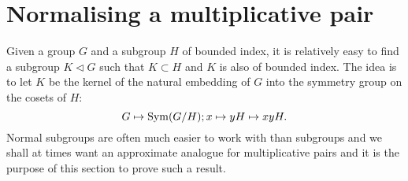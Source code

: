 \documentclass[12pt]{amsart}
\numberwithin{equation}{section}
\theoremstyle{plain}
\theoremstyle{definition}
\providecommand{\Sym}{\mathop{\rm Sym}\nolimits}
\begin{document}
\section{Normalising a multiplicative pair}\label{sec.norm}
 
Given a group $G$ and a subgroup $H$ of bounded index, it is relatively easy to find a subgroup $K\lhd G$ such that $K \subset H$ and $K$ is also of bounded index.  The idea is to let $K$ be the kernel of the natural embedding of $G$ into the symmetry group on the cosets of $H$:
\begin{equation*}
G \mapsto \Sym(G/H); x \mapsto yH \mapsto xyH.
\end{equation*}
Normal subgroups are often much easier to work with than subgroups and we shall at times want an approximate analogue for multiplicative pairs and it is the purpose of this section to prove such a result.
\end{document}
